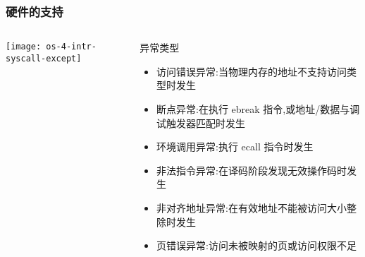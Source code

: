 \begin{frame}[plain,t]
	\frametitle{硬件的支持}
	\begin{columns}
		
		\begin{column}{0.5\textwidth}
			\centering
			\texttt{[image: os-4-intr-syscall-except]}
		\end{column}
		
		\begin{column}{0.5\textwidth}
			
			异常类型
			\begin{itemize}
				\item 访问错误异常:当物理内存的地址不支持访问类型时发生 \pause
				\item 断点异常:在执行 ebreak 指令,或地址/数据与调试触发器匹配时发生 \pause
				\item 环境调用异常:执行 ecall 指令时发生 \pause
				\item 非法指令异常:在译码阶段发现无效操作码时发生 \pause
				\item 非对齐地址异常:在有效地址不能被访问大小整除时发生 \pause
				\item 页错误异常:访问未被映射的页或访问权限不足
				
			\end{itemize}		
			
		\end{column}
		
	\end{columns}
	
\end{frame}



